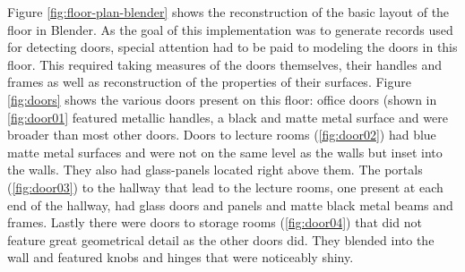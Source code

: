 Figure \ref{fig:floor-plan-blender} shows the reconstruction of the basic layout of the floor in Blender. As the goal of this implementation was to generate records used for detecting doors, special attention had to be paid to modeling the doors in this floor. This required taking measures of the doors themselves, their handles and frames as well as reconstruction of the properties of their surfaces. Figure \ref{fig:doors} shows the various doors present on this floor: office doors (shown in \ref{fig:door01} featured metallic handles, a black and matte metal surface and were broader than most other doors. Doors to lecture rooms (\ref{fig:door02}) had blue matte metal surfaces and were not on the same level as the walls but inset into the walls. They also had glass-panels located right above them. The portals (\ref{fig:door03}) to the hallway that lead to the lecture rooms, one present at each end of the hallway, had glass doors and panels and matte black metal beams and frames. Lastly there were doors to storage rooms (\ref{fig:door04}) that did not feature great geometrical detail as the other doors did. They blended into the wall and featured knobs and hinges that were noticeably shiny.

